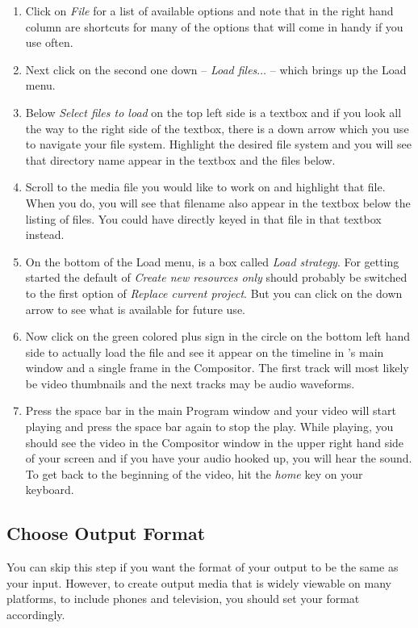 \begin{enumerate}
	\item Click on \textit{File} for a list of available options and note that in the right hand column are shortcuts for
	many of the options that will come in handy if you use \CGG{} often.
	\item Next click on the second one down -- \textit{Load files$\dots$} -- which brings up the Load menu.
	\item Below \textit{Select files to load} on the top left side is a textbox and if you look all the way to the right
	side of the textbox, there is a down arrow which you use to navigate your file system.  Highlight the
	desired file system and you will see that directory name appear in the textbox and the files below.
	\item Scroll to the media file you would like to work on and highlight that file.  When you do, you will
	see that filename also appear in the textbox below the listing of files.  You could have directly
	keyed in that file in that textbox instead.
	\item On the bottom of the Load menu, is a box called \textit{Load strategy}.  For getting started the
	default of \textit{Create new resources only} should probably be switched to the
first option of \textit{Replace current project}.  But you can click on the down arrow to see what
	is available for future use.
	\item Now click on the green colored plus sign in the circle on the bottom left hand side to actually load the file
	and see it appear on the timeline in \CGG{}’s main window and a single frame in the Compositor.
	The first track will most likely be video thumbnails and the next tracks may be audio waveforms.
	\item Press the space bar in the main Program window and your video will start playing and press the
	space bar again to stop the play.  While playing, you should see the video in the Compositor
	window in the upper right hand side of your screen and if you have your audio hooked up, you
	will hear the sound.  To get back to the beginning of the video, hit the \textit{home} key on your keyboard.
\end{enumerate}

\subsection{Choose Output Format}%
\label{sub:choose_output_format}
	
You can skip this step if you want the format of your output to be the same as your input.  However, to create output media that is widely viewable on many platforms, to include phones and television, you should set your format accordingly.

